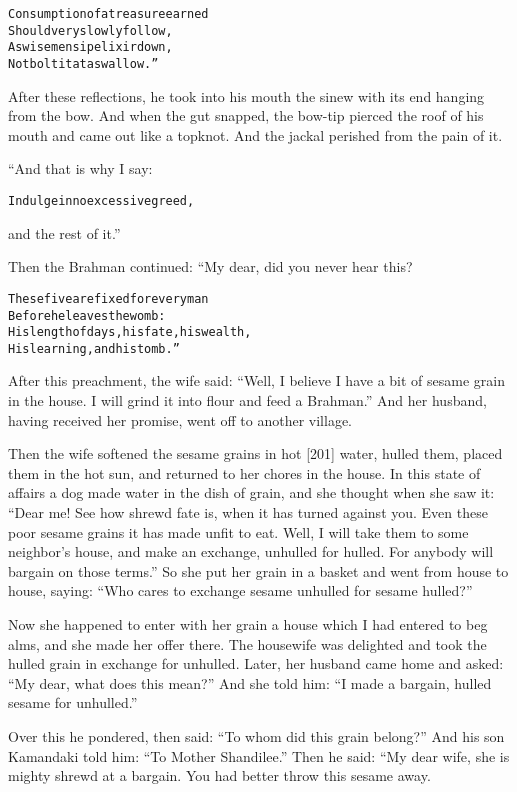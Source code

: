 \documentclass{article}
\renewenvironment{verbatim}{\begin{alltt}\normalfont\begin{centering}}{\end{centering}\end{alltt}}
\begin{document}
\begin{verbatim}
Consumption of a treasure earned
    Should very slowly follow,
As wise men sip elixir down,
    Not bolt it at a swallow.”
\end{verbatim}
After these reflections, he took into his mouth the sinew with its
end hanging from the bow. And when the gut snapped, the bow-tip
pierced the roof of his mouth and came out like a topknot. And the
jackal perished from the pain of it.

“And that is why I say:

\begin{verbatim}
Indulge in no excessive greed,
\end{verbatim}
and the rest of it.”

Then the Brahman continued: “My dear, did you never hear this?

\begin{verbatim}
These five are fixed for every man
    Before he leaves the womb:
His length of days, his fate, his wealth,
    His learning, and his tomb.”
\end{verbatim}
After this preachment, the wife said:
``Well, I believe I have a bit of sesame grain in the house. I will grind it into flour and feed a Brahman.''
And her husband, having received her promise, went off to another
village.

Then the wife softened the sesame grains in hot [201] water, hulled
them, placed them in the hot sun, and returned to her chores in the
house. In this state of affairs a dog made water in the dish of
grain, and she thought when she saw it:
``Dear me! See how shrewd fate is, when it has turned against you. Even these poor sesame grains it has made unfit to eat. Well, I will take them to some neighbor's house, and make an exchange, unhulled for hulled. For anybody will bargain on those terms.''
So she put her grain in a basket and went from house to house,
saying:
``Who cares to exchange sesame unhulled for sesame hulled?''

Now she happened to enter with her grain a house which I had
entered to beg alms, and she made her offer there. The housewife
was delighted and took the hulled grain in exchange for unhulled.
Later, her husband came home and asked:
``My dear, what does this mean?'' And she told him:
``I made a bargain, hulled sesame for unhulled.''

Over this he pondered, then said:
``To whom did this grain belong?'' And his son Kamandaki told him:
``To Mother Shandilee.'' Then he said: “My dear wife, she is mighty
shrewd at a bargain. You had better throw this sesame away.
\end{document}
